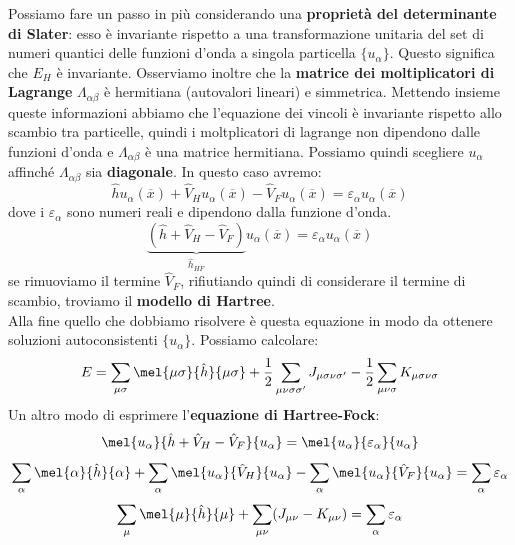 Possiamo fare un passo in più considerando una \textbf{proprietà del determinante di Slater}: esso è invariante rispetto a una transformazione unitaria del set di numeri quantici delle funzioni d'onda a singola particella $\{u_\alpha\}$. Questo significa che $E_H$ è invariante. Osserviamo inoltre che la \textbf{matrice dei moltiplicatori di Lagrange} $\Lambda_{\alpha\beta}$ è hermitiana (autovalori lineari) e simmetrica. Mettendo insieme queste informazioni abbiamo che l'equazione dei vincoli è invariante rispetto allo scambio tra particelle, quindi i moltplicatori di lagrange non dipendono dalle funzioni d'onda e $\Lambda_{\alpha\beta}$ è una matrice hermitiana. Possiamo quindi scegliere $u_\alpha$ affinché $\Lambda_{\alpha\beta}$ sia \textbf{diagonale}. In questo caso avremo:
\begin{equation*}
    \hat h u_\alpha(\overline x)+\hat V_{H}u_\alpha(\overline x)-\hat V_{F}u_\alpha(\overline x)=\varepsilon_\alpha u_\alpha(\overline x)
\end{equation*}
dove i $\varepsilon_\alpha$ sono numeri reali e dipendono dalla funzione d'onda.
\begin{equation*}
    \underbrace{(\hat h + \hat V_H - \hat V_F)}_{\hat h_{HF}}u_\alpha(\overline x)=\varepsilon_\alpha u_\alpha(\overline x)
\end{equation*}
se rimuoviamo il termine $\hat V_F$, rifiutiando quindi di considerare il termine di scambio, troviamo il \textbf{modello di Hartree}. \\
Alla fine quello che dobbiamo risolvere è questa equazione in modo da ottenere soluzioni autoconsistenti $\{u_\alpha\}$. Possiamo calcolare:
\begin{equation*}
    E=\sum_{\mu\sigma}\mel{\mu\sigma}{\hat h}{\mu\sigma}+\frac 12 \sum_{\mu\nu\sigma\sigma'}J_{\mu\sigma\nu\sigma'}-\frac 12 \sum_{\mu\nu\sigma}K_{\mu\sigma\nu\sigma}
\end{equation*}
Un altro modo di esprimere l'\textbf{equazione di Hartree-Fock}:
\begin{equation*}
    \mel{u_\alpha}{\hat h + \hat V_H - \hat V_F}{u_\alpha}=\mel{u_\alpha}{\varepsilon_\alpha}{u_\alpha}
\end{equation*}
\begin{equation*}
    \sum_\alpha\mel{\alpha}{\hat h}{\alpha}+\sum_\alpha\mel{u_\alpha}{\hat V_H}{u_\alpha}-\sum_\alpha\mel{u_\alpha}{\hat V_F}{u_\alpha}=\sum_\alpha\varepsilon_\alpha
\end{equation*}
\begin{equation*}
    \sum_\mu\mel{\mu}{\hat h}{\mu}+\sum_{\mu\nu}(J_{\mu\nu}-K_{\mu\nu})=\sum_\alpha \varepsilon_\alpha
\end{equation*}

